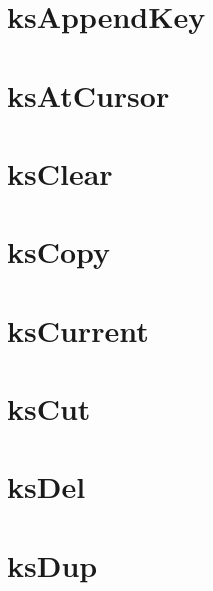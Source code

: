\let\mypdfximage\pdfximage\def\pdfximage{\immediate\mypdfximage}\documentclass[twoside]{book}
\newcommand{\+}{\discretionary{\mbox{\scriptsize$\hookleftarrow$}}{}{}}
\begin{document}
\chapter{ks\+Append\+Key}
\label{doc_contrib_api_reviews_core_ksAppendKey_md}

\chapter{ks\+At\+Cursor}
\label{doc_contrib_api_reviews_core_ksAtCursor_md}

\chapter{ks\+Clear}
\label{doc_contrib_api_reviews_core_ksClear_md}

\chapter{ks\+Copy}
\label{doc_contrib_api_reviews_core_ksCopy_md}

\chapter{ks\+Current}
\label{doc_contrib_api_reviews_core_ksCurrent_md}

\chapter{ks\+Cut}
\label{doc_contrib_api_reviews_core_ksCut_md}

\chapter{ks\+Del}
\label{doc_contrib_api_reviews_core_ksDel_md}

\chapter{ks\+Dup}
\label{doc_contrib_api_reviews_core_ksDup_md}

\end{document}
